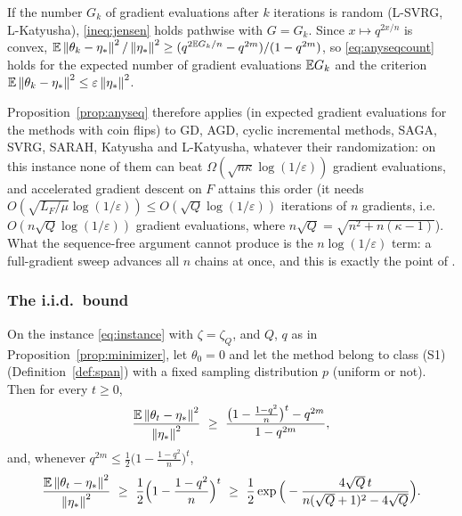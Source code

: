 If the number $G_k$ of gradient evaluations after $k$ iterations is random (L-SVRG, L-Katyusha), \eqref{ineq:jensen} holds pathwise with $G=G_k$. Since $x\mapsto q^{2x/n}$ is convex, $\mathbb{E}\left\|\theta_k-\eta_\ast\right\|^2/\left\|\eta_\ast\right\|^2\ge(q^{2\mathbb{E} G_k/n}-q^{2m})/(1-q^{2m})$, so \eqref{eq:anyseqcount} holds for the expected number of gradient evaluations $\mathbb{E} G_k$ and the criterion $\mathbb{E}\left\|\theta_k-\eta_\ast\right\|^2\le\varepsilon\left\|\eta_\ast\right\|^2$.

Proposition~\ref{prop:anyseq} therefore applies (in expected gradient evaluations for the methods with coin flips) to GD, AGD, cyclic incremental methods, SAGA, SVRG, SARAH, Katyusha and L-Katyusha, whatever their randomization: on this instance none of them can beat $\Omega(\sqrt{n\kappa}\log(1/\varepsilon))$ gradient evaluations, and accelerated gradient descent on $F$ attains this order (it needs $O(\sqrt{L_F/\mu}\log(1/\varepsilon))\le O(\sqrt Q\log(1/\varepsilon))$ iterations of $n$ gradients, i.e.\ $O(n\sqrt Q\log(1/\varepsilon))$ gradient evaluations, where $n\sqrt Q=\sqrt{n^2+n(\kappa-1)}$). What the sequence-free argument cannot produce is the $n\log(1/\varepsilon)$ term: a full-gradient sweep advances all $n$ chains at once, and this is exactly the point of \cite{hannah2018breaking}.

\subsubsection{The i.i.d.\ bound}

\begin{theorem}
\label{thm:instance}
On the instance \eqref{eq:instance} with $\zeta=\zeta_Q$, and $Q$, $q$ as in Proposition~\ref{prop:minimizer}, let $\theta_0=0$ and let the method belong to class (S1) (Definition~\ref{def:span}) with a fixed sampling distribution $p$ (uniform or not). Then for every $t\ge0$,
\begin{equation}
\label{ineq:expected}
\frac{\E\norm{\theta_t-\etastar}^2}{\norm{\etastar}^2}\ \ge\ \frac{\big(1-\frac{1-q^2}n\big)^t-q^{2m}}{1-q^{2m}},
\end{equation}
and, whenever $q^{2m}\le\frac12\big(1-\frac{1-q^2}n\big)^t$,
\begin{equation}
\label{ineq:exp}
\frac{\E\norm{\theta_t-\etastar}^2}{\norm{\etastar}^2}\ \ge\ \frac12\Big(1-\frac{1-q^2}n\Big)^t\ \ge\ \frac12\exp\Big(-\frac{4\sqrt Q\,t}{n(\sqrt Q+1)^2-4\sqrt Q}\Big).
\end{equation}
\end{theorem}

